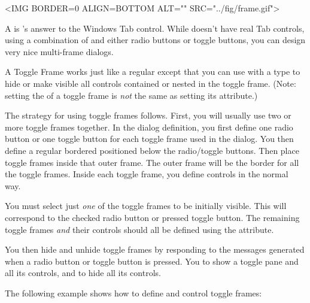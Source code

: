 
\small
\begin{rawhtml}
<IMG BORDER=0 ALIGN=BOTTOM ALT="" SRC="../fig/frame.gif">
\end{rawhtml}
\begin{latexonly}

\end{latexonly}
\normalfont\normalsize
\vspace{.1in}

A  is \V's answer to the Windows Tab
control. While \V doesn't have real Tab controls, using
a combination of  and either
radio buttons or toggle buttons, you can design very nice
multi-frame dialogs.

A Toggle Frame works just like a regular  except
that you can use  with a type  to
hide or make visible all controls contained or nested in the
toggle frame. (Note: setting the  of a toggle
frame is \emph{not} the same as setting its 
attribute.)

The strategy for using toggle frames follows. First, you
will usually use two or more toggle frames together.
In the dialog  definition, you first
define one radio button or one toggle button for each
toggle frame used in the dialog. You then define a
regular bordered  positioned below the radio/toggle
buttons. Then place  toggle frames
inside that outer frame. The outer frame will be the
border for all the toggle frames. Inside each toggle frame,
you define controls in the normal way.

You must select just \emph{one} of the toggle frames to
be initially visible. This will correspond to the checked
radio button or pressed toggle button. The remaining
toggle frames \emph{and} their controls should all be
defined using the  attribute.

You then hide and unhide toggle frames by responding
to the  messages generated
when a radio button or toggle button is pressed. You
 to show a toggle pane
and all its controls, and 
to hide all its controls.

The following example shows how to define and control
toggle frames:

